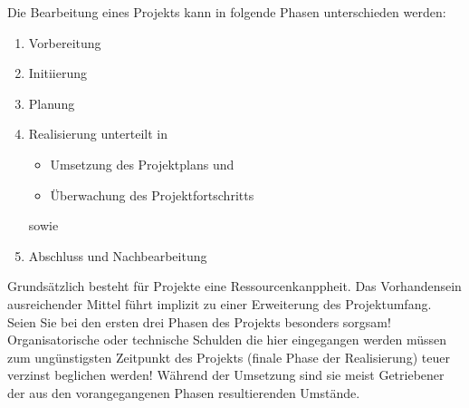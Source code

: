 \renewcommand*{\authorOfNextLines}{Helmut Quinz}
Die Bearbeitung eines Projekts kann in folgende Phasen unterschieden werden:
\begin{enumerate}
	\item Vorbereitung
	\item Initiierung
	\item Planung
	\item Realisierung unterteilt in
	\begin{itemize}
		\item Umsetzung des Projektplans und
		\item Überwachung des Projektfortschritts
	\end{itemize}
	sowie
	\item Abschluss und Nachbearbeitung
\end{enumerate}
Grundsätzlich besteht für Projekte eine Ressourcenkanppheit.
Das Vorhandensein ausreichender Mittel führt implizit zu einer Erweiterung des Projektumfang.\\

Seien Sie bei den ersten drei Phasen des Projekts besonders sorgsam!
Organisatorische oder technische Schulden die hier eingegangen werden müssen zum ungünstigsten Zeitpunkt des Projekts (finale Phase der Realisierung) teuer verzinst beglichen werden!
Während der Umsetzung sind sie meist Getriebener der aus den vorangegangenen Phasen resultierenden Umstände.
